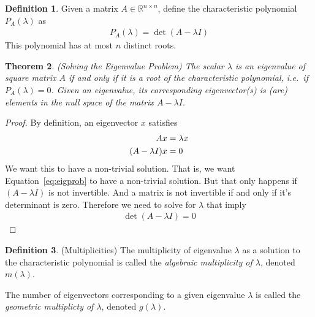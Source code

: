 \documentclass[12pt]{article}
\numberwithin{equation}{section} %
\theoremstyle{plain}
\newtheorem{thm}{Theorem}[section]
\theoremstyle{definition}
\newtheorem{defn}[thm]{Definition}
\theoremstyle{remark}
\newcommand{\R}{\mathbb{R}}
\begin{document}
\begin{defn}
Given a matrix $A\in \R^{n\times n}$, define the characteristic
polynomial $P_A(\lambda)$ as
\begin{align}
  \label{chareqn}
  P_A(\lambda) = \det(A-\lambda I)
\end{align}
This polynomial has at most $n$ distinct roots.
\end{defn}

\begin{thm}\emph{(Solving the Eigenvalue Problem)}
The scalar $\lambda$ is an eigenvalue of square matrix $A$ if and only
if it is a root of the characteristic polynomial, i.e.\ if
$P_A(\lambda)=0$.  Given an eigenvalue, its corresponding eigenvector(s)
is (are) elements in the null space of the matrix $A-\lambda I$.
\end{thm}
\begin{proof}
By definition, an eigenvector $x$ satisfies
\begin{align}
  A x &= \lambda x\notag\\
  (A- \lambda I)x &= 0
  \label{eq:eigprob}
\end{align}
We want this to have a non-trivial solution. That is, we want
Equation~\ref{eq:eigprob} to have a non-trivial solution. But that only
happens if $(A-\lambda I)$ is not invertible. And a matrix is not
invertible if and only if it's determinant is zero. Therefore we need to
solve for $\lambda$ that imply
\begin{align*}
  \det(A-\lambda I)=0
\end{align*}
\end{proof}


\begin{defn}{(Multiplicities)}
The multiplicity of eigenvalue $\lambda$ as a solution to the
characteristic polynomial is called the \emph{algebraic multiplicity of
$\lambda$}, denoted $m(\lambda)$.

The number of eigenvectors corresponding to a given eigenvalue $\lambda$
is called the \emph{geometric multiplicty of $\lambda$}, denoted
$g(\lambda)$.
\end{defn}
\end{document}
